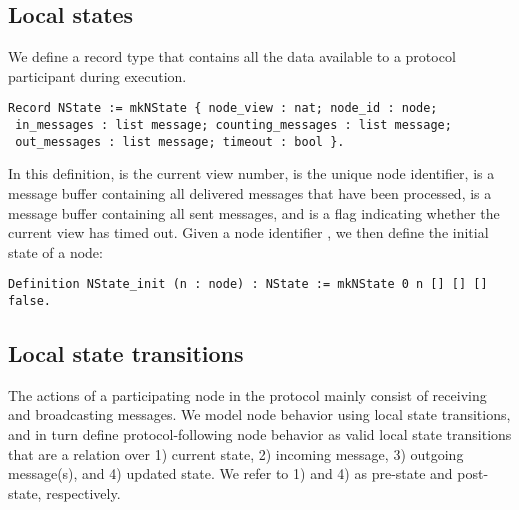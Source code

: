 \documentclass{easychair}
\begin{document}
\subsection{Local states}
We define a record type  that contains all the data available to a protocol participant during execution. 
\begin{lstlisting}[language=Coq]
Record NState := mkNState { node_view : nat; node_id : node; 
 in_messages : list message; counting_messages : list message; 
 out_messages : list message; timeout : bool }.
\end{lstlisting}
In this definition,  is the current view number,  is the unique node identifier,  is a message buffer containing all delivered messages that have been processed,  is a message buffer containing all sent messages, and  is a flag indicating whether the current view has timed out.
%
Given a node identifier , we then define the initial state of a node:
\begin{lstlisting}[language=Coq]
Definition NState_init (n : node) : NState := mkNState 0 n [] [] [] false.
\end{lstlisting}

\subsection{Local state transitions} 
The actions of a participating node in the protocol mainly consist of receiving and broadcasting messages. We model node behavior using local state transitions, and in turn define protocol-following node behavior as valid local state transitions that are a relation over 1) current state, 2) incoming message, 3) outgoing message(s), and 4) updated state. We refer to 1) and 4) as pre-state and post-state, respectively.
\end{document}
